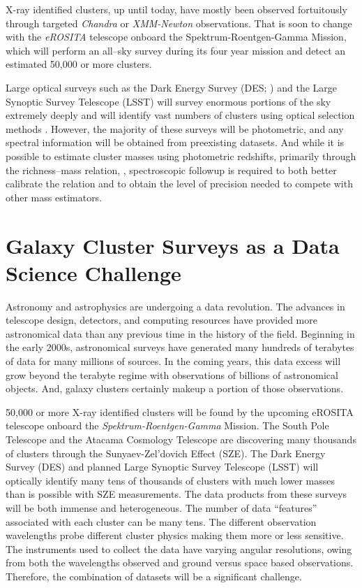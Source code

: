 X-ray identified clusters, up until today, have mostly been observed fortuitously through targeted \textit{Chandra} or \textit{XMM-Newton} observations. That is soon to change with the \textit{eROSITA} telescope onboard the Spektrum-Roentgen-Gamma Mission, which will perform an all--sky survey during its four year mission and detect an estimated 50,000 or more clusters.

Large optical surveys such as the Dark Energy Survey (DES; \citealt{DES2005}) and the Large Synoptic Survey Telescope (LSST) will survey enormous portions of the sky extremely deeply and will identify vast numbers of clusters using optical selection methods . However, the majority of these surveys will be photometric, and any spectral information will be obtained from preexisting datasets. And while it is possible to estimate cluster masses using photometric redshifts, primarily through the richness--mass relation, , spectroscopic followup is required to both better calibrate the relation and to obtain the level of precision needed to compete with other mass estimators. 

\section{Galaxy Cluster Surveys as a Data Science Challenge}
Astronomy and astrophysics are undergoing a data revolution. The advances in telescope design, detectors, and computing resources have provided more astronomical data than any previous time in the history of the field. Beginning in the early 2000s, astronomical surveys have generated many hundreds of terabytes of data for many millions of sources. In the coming years, this data excess will grow beyond the terabyte regime with observations of billions of astronomical objects. And, galaxy clusters certainly makeup a portion of those observations. 

50,000 or more X-ray identified clusters will be found by the upcoming eROSITA telescope onboard the \emph{Spektrum-Roentgen-Gamma} Mission. The South Pole Telescope and the Atacama Cosmology Telescope are discovering many thousands of clusters through the Sunyaev-Zel’dovich Effect (SZE). The Dark Energy Survey (DES) and planned Large Synoptic Survey Telescope (LSST) will optically identify  many tens of thousands of clusters with much lower masses than is possible with SZE measurements. The data products from these surveys will be both immense and heterogeneous. The number of data ``features'' associated with each cluster can be many tens. The different observation wavelengths probe different cluster physics making them more or less sensitive. The instruments used to collect the data have varying angular resolutions, owing from both the wavelengths observed and ground versus space based observations. Therefore, the combination of datasets will be a significant challenge.

